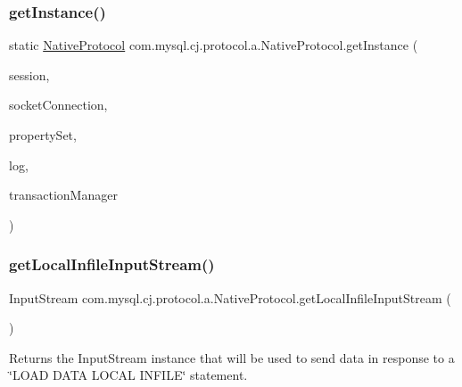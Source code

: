 \subsubsection{\texorpdfstring{get\+Instance()}{getInstance()}}
{\footnotesize\ttfamily static \mbox{\hyperlink{classcom_1_1mysql_1_1cj_1_1protocol_1_1a_1_1_native_protocol}{Native\+Protocol}} com.\+mysql.\+cj.\+protocol.\+a.\+Native\+Protocol.\+get\+Instance (\begin{DoxyParamCaption}\item[{\mbox{\hyperlink{interfacecom_1_1mysql_1_1cj_1_1_session}{Session}}}]{session,  }\item[{\mbox{\hyperlink{interfacecom_1_1mysql_1_1cj_1_1protocol_1_1_socket_connection}{Socket\+Connection}}}]{socket\+Connection,  }\item[{\mbox{\hyperlink{interfacecom_1_1mysql_1_1cj_1_1conf_1_1_property_set}{Property\+Set}}}]{property\+Set,  }\item[{\mbox{\hyperlink{interfacecom_1_1mysql_1_1cj_1_1log_1_1_log}{Log}}}]{log,  }\item[{\mbox{\hyperlink{interfacecom_1_1mysql_1_1cj_1_1_transaction_event_handler}{Transaction\+Event\+Handler}}}]{transaction\+Manager }\end{DoxyParamCaption})\hspace{0.3cm}{\ttfamily [static]}}

\mbox{\label{classcom_1_1mysql_1_1cj_1_1protocol_1_1a_1_1_native_protocol_a27e42d277d58cc8bc89f098b9ac90691}} 
\subsubsection{\texorpdfstring{get\+Local\+Infile\+Input\+Stream()}{getLocalInfileInputStream()}}
{\footnotesize\ttfamily Input\+Stream com.\+mysql.\+cj.\+protocol.\+a.\+Native\+Protocol.\+get\+Local\+Infile\+Input\+Stream (\begin{DoxyParamCaption}{ }\end{DoxyParamCaption})}

Returns the Input\+Stream instance that will be used to send data in response to a \char`\"{}\+L\+O\+A\+D D\+A\+T\+A L\+O\+C\+A\+L I\+N\+F\+I\+L\+E\char`\"{} statement.

